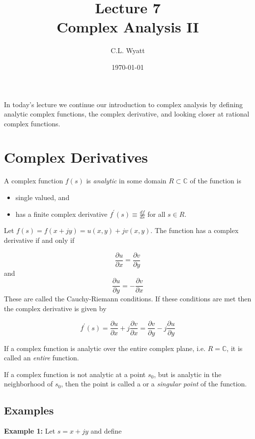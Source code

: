 \documentclass{article}
\begin{document}
\title{Lecture 7\\ Complex Analysis II}
\author{C.L. Wyatt}
\date{\today}
\maketitle

In today's lecture we continue our introduction to complex analysis by defining analytic complex functions, the complex derivative, and looking closer at rational complex functions.

\section{Complex Derivatives}

A complex function $f(s)$ is \textit{analytic} in some domain $R\subset\mathbb{C}$ of the function is

\begin{itemize}
\item single valued, and
\item has a finite complex derivative $f^\prime(s) \equiv \frac{df}{ds}$ for all $s\in R$.
\end{itemize}

Let $f(s) = f(x + jy) = u(x,y) + jv(x,y)$. The function has a complex derivative if and only if

\[
\frac{\partial u}{\partial x} = \frac{\partial v}{\partial y}  
\]
and
\[
\frac{\partial u}{\partial y} = -\frac{\partial v}{\partial x}  
\]
These are called the Cauchy-Riemann conditions. If these conditions are met then the complex derivative is given by

\[
f^\prime(s) = \frac{\partial u}{\partial x} + j \frac{\partial v}{\partial x} = \frac{\partial v}{\partial y} - j \frac{\partial u}{\partial y}
\]

If a complex function is analytic over the entire complex plane, i.e. $R = \mathbb{C}$, it is called an \textit{entire} function.

If a complex function is not analytic at a point $s_0$, but is analytic in the neighborhood of $s_0$, then the point is called a  or a \textit{singular point} of the function.

\subsection{Examples}

\textbf{Example 1:} Let $s = x+jy$ and define
\end{document}
